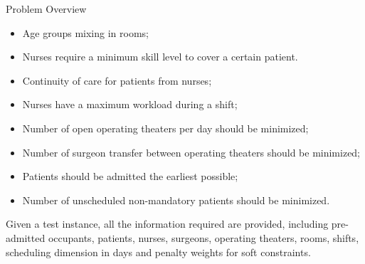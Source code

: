 \begin{section}{Problem Overview}
\begin{itemize}
           \begin{itemize}
               \item Age groups mixing in rooms;
               \item Nurses require a minimum skill level to cover a certain patient.
               \item Continuity of care for patients from nurses;
               \item Nurses have a maximum workload during a shift;
               \item Number of open operating theaters per day should be minimized;
               \item Number of surgeon transfer between operating theaters should be minimized;
               \item Patients should be admitted the earliest possible;
               \item Number of unscheduled non-mandatory patients should be minimized.
           \end{itemize}
 \end{itemize}

 Given a test instance, all the information required are provided,
 including pre-admitted occupants, patients, nurses, surgeons,
 operating theaters, rooms, shifts, scheduling dimension in days and penalty weights for soft constraints.


\end{section}